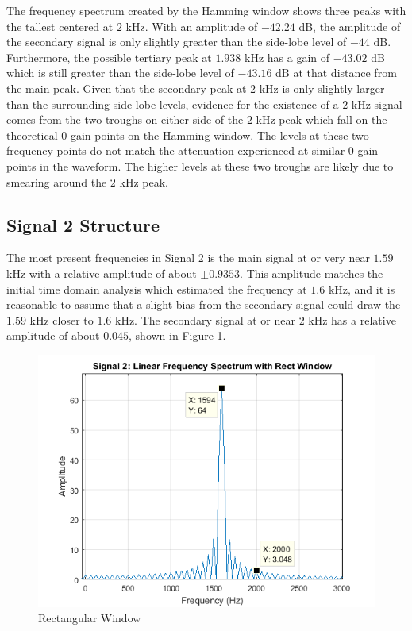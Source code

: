 \documentclass[pdftex, 10pt]{IEEEtran}
\begin{document}
The frequency spectrum created by the Hamming window shows three peaks with the tallest centered at $2$ kHz.
With an amplitude of $-42.24$ dB, the amplitude of the secondary signal 
is only slightly greater than the side-lobe level of $-44$ dB. Furthermore, the possible 
tertiary peak at $1.938$ kHz has a gain of $-43.02$ dB which is still greater than the side-lobe level of 
$-43.16$ dB at that distance from the main peak. Given that the secondary peak at $2$ kHz is only slightly
larger than the surrounding side-lobe levels, evidence for the existence of a $2$ kHz signal comes from
the two troughs on either side of the $2$ kHz peak which fall on the theoretical $0$ gain points on the
Hamming window. The levels at these two frequency points do not match the attenuation experienced at
similar $0$ gain points in the waveform. The higher levels at these two troughs are likely due to smearing
around the $2$ kHz peak.

\subsection{Signal 2 Structure}
The most present frequencies in Signal 2 is the main signal at or very near $1.59$ kHz with a
relative amplitude of about $\pm 0.9353$. This amplitude matches the initial time domain analysis
which estimated the frequency at $1.6$ kHz, and it is reasonable to assume that a slight bias from
the secondary signal could draw the $1.59$ kHz closer to $1.6$ kHz. The secondary signal at or near $2$ kHz
has a relative amplitude of about $0.045$, shown in Figure \ref{fig:sig2_fd_rt_ln_2}.

\begin{figure}
    \centering
    \includegraphics[scale=0.5]{sig2_fd_rt_ln_2}
    \caption{Rectangular Window}
    \label{fig:sig2_fd_rt_ln_2}
\end{figure}
\end{document}
